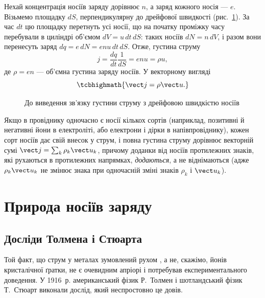 Нехай концентрація носіїв заряду дорівнює $n$, а заряд кожного носія --- $e$. Візьмемо площадку $dS$, перпендикулярну до дрейфової швидкості
(рис.~\ref{pic:ElectronCylinder}). За час $dt$ цю площадку перетнуть усі носії, що на початку проміжку часу перебували в циліндрі об'ємом
$dV = u\,dt\, dS$: таких носіїв $dN = n\,dV$, і разом вони перенесуть заряд $dq = e\,dN = enu\,dt\,dS$. Отже, густина струму
\begin{equation*}
	j = \frac{dq}{dt}\frac1{dS} = enu = \rho u,
\end{equation*}
де $\rho = en$ --- об'ємна густина заряду носіїв. У векторному вигляді
\begin{equation}\label{eq:JRhoU}
	\tcbhighmath{
		\vect j = \rho\vect u.
	}
\end{equation}

\begin{figure}\centering
	\caption{До виведення зв'язку густини струму з дрейфовою швидкістю носіїв\label{pic:ElectronCylinder}}
\end{figure}

\begin{Attention}
	Якщо в провіднику одночасно є носії кількох сортів (наприклад, позитивні й негативні йони в електроліті, або електрони і дірки в
	напівпровіднику), кожен сорт носіїв дає свій внесок у струм, і повна густина струму дорівнює векторній сумі $\vect j = \sum_k \rho_k \vect
	u_k$, причому доданки від носіїв протилежних знаків, які рухаються в протилежних напрямках, \emph{додаються}, а не віднімаються (адже
	$\rho_k \vect u_k$ не змінює знака при одночасній зміні знаків $\rho_k$ і $\vect u_k$).
\end{Attention}

\section{Природа носіїв заряду}\hypertarget{charge-carriers-nature}{}

\subsection*{Досліди Толмена і Стюарта}

Той факт, що струм у металах зумовлений рухом , а не, скажімо, йонів кристалічної ґратки, не є очевидним апріорі і
потребував експериментального доведення. У 1916~р. американський фізик Р.~Толмен і шотландський фізик Т.~Стюарт виконали дослід, який
неспростовно це довів.


